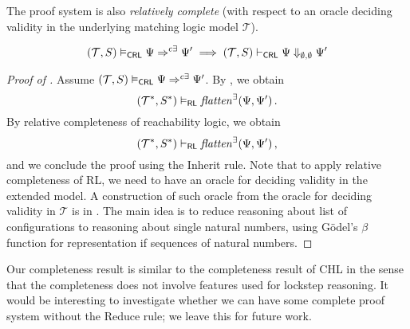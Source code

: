 


The proof system is also \emph{relatively complete} (with respect to an oracle deciding validity
in the underlying matching logic model $\mathcal{T}$).
\begin{theorem}\label{thm:relativeCompleteness}
  \begin{equation*}
      (\mathcal{T}, S) \vDash_{\mathsf{CRL}} \Psi \Rightarrow^{c\exists} \Psi^\prime \implies
      (\mathcal{T}, S) \vdash_{\mathsf{CRL}} \Psi \Downarrow_{\emptyset,\emptyset} \Psi^\prime
  \end{equation*}
  \end{theorem}
  \begin{proof}[Proof of ]
  Assume $(\mathcal{T}, S) \vDash_{\mathsf{CRL}} \Psi \Rightarrow^{c\exists} \Psi^\prime$.
  By , 
  we obtain
  \begin{equation*}
    (\mathcal{T}^*, S^*) \vDash_{\mathsf{RL}}
    \mathit{flatten}^\exists(\Psi, \Psi^\prime) \, .
  \end{equation*}
  By relative completeness of reachability logic, we obtain
  \begin{equation*}
    (\mathcal{T}^*, S^*) \vdash_{\mathsf{RL}}
    \mathit{flatten}^\exists(\Psi, \Psi^\prime) \, ,
  \end{equation*}
  and we conclude the proof using the Inherit rule.
  Note that to apply relative completeness of RL, we need to have an oracle for deciding validity in the extended model.
  A construction of such oracle from the oracle for deciding validity in $\mathcal{T}$ is in .
  The main idea is to reduce reasoning about list of configurations to reasoning about single natural numbers,
  using Gödel's $\beta$ function for representation if sequences of natural numbers.
  \end{proof}
Our completeness result is similar to the completeness result of CHL in the sense that the completeness
does not involve features used for lockstep reasoning.
It would be interesting to investigate whether we can have some complete proof system without the Reduce rule;
we leave this for future work.


